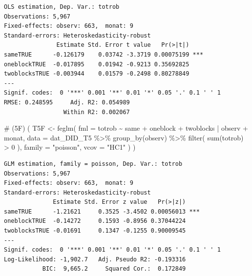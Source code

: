 \documentclass[
  a4paper,
  DIV=11,
  oneside]{scrreprt}
\newenvironment{Shaded}{\begin{snugshade}}{\end{snugshade}}
\newcommand{\AttributeTok}[1]{\textcolor[rgb]{0.40,0.45,0.13}{#1}}
\newcommand{\CommentTok}[1]{\textcolor[rgb]{0.37,0.37,0.37}{#1}}
\newcommand{\DecValTok}[1]{\textcolor[rgb]{0.68,0.00,0.00}{#1}}
\newcommand{\FunctionTok}[1]{\textcolor[rgb]{0.28,0.35,0.67}{#1}}
\newcommand{\NormalTok}[1]{\textcolor[rgb]{0.00,0.23,0.31}{#1}}
\newcommand{\OtherTok}[1]{\textcolor[rgb]{0.00,0.23,0.31}{#1}}
\newcommand{\SpecialCharTok}[1]{\textcolor[rgb]{0.37,0.37,0.37}{#1}}
\newcommand{\StringTok}[1]{\textcolor[rgb]{0.13,0.47,0.30}{#1}}
\begin{document}
\begin{verbatim}
OLS estimation, Dep. Var.: totrob
Observations: 5,967
Fixed-effects: observ: 663,  monat: 9
Standard-errors: Heteroskedasticity-robust 
               Estimate Std. Error t value   Pr(>|t|)    
sameTRUE      -0.126179    0.03742 -3.3719 0.00075199 ***
oneblockTRUE  -0.017895    0.01942 -0.9213 0.35692825    
twoblocksTRUE -0.003944    0.01579 -0.2498 0.80278849    
---
Signif. codes:  0 '***' 0.001 '**' 0.01 '*' 0.05 '.' 0.1 ' ' 1
RMSE: 0.248595     Adj. R2: 0.054989
                 Within R2: 0.002067
\end{verbatim}

\begin{Shaded}
\begin{Highlighting}[]
\CommentTok{\# (5F) }
\NormalTok{(}
\NormalTok{  T5F }\OtherTok{\textless{}{-}} \FunctionTok{feglm}\NormalTok{(}
    \AttributeTok{fml =}\NormalTok{ totrob }\SpecialCharTok{\textasciitilde{}} 
\NormalTok{      same}
    \SpecialCharTok{+}\NormalTok{ oneblock}
    \SpecialCharTok{+}\NormalTok{ twoblocks}
    \SpecialCharTok{|}\NormalTok{ observ }\SpecialCharTok{+}\NormalTok{ monat,}
    \AttributeTok{data =}\NormalTok{ dat\_DID\_T5 }\SpecialCharTok{\%\textgreater{}\%} 
      \FunctionTok{group\_by}\NormalTok{(observ) }\SpecialCharTok{\%\textgreater{}\%} 
      \FunctionTok{filter}\NormalTok{(}
        \FunctionTok{sum}\NormalTok{(totrob) }\SpecialCharTok{\textgreater{}} \DecValTok{0}
\NormalTok{      ), }
    \AttributeTok{family =} \StringTok{"poisson"}\NormalTok{, }
    \AttributeTok{vcov =} \StringTok{"HC1"}
\NormalTok{  )}
\NormalTok{)}
\end{Highlighting}
\end{Shaded}

\begin{verbatim}
GLM estimation, family = poisson, Dep. Var.: totrob
Observations: 5,967
Fixed-effects: observ: 663,  monat: 9
Standard-errors: Heteroskedasticity-robust 
              Estimate Std. Error z value   Pr(>|z|)    
sameTRUE      -1.21621     0.3525 -3.4502 0.00056013 ***
oneblockTRUE  -0.14272     0.1593 -0.8956 0.37044224    
twoblocksTRUE -0.01691     0.1347 -0.1255 0.90009545    
---
Signif. codes:  0 '***' 0.001 '**' 0.01 '*' 0.05 '.' 0.1 ' ' 1
Log-Likelihood: -1,902.7   Adj. Pseudo R2: -0.193316
           BIC:  9,665.2     Squared Cor.:  0.172849
\end{verbatim}
\end{document}
